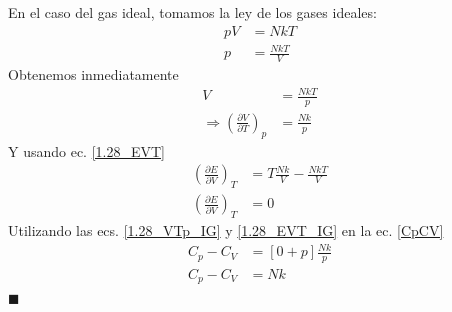 \documentclass[]{article}
\numberwithin{equation}{section}
\newcommand{\0}{\textcolor{gray}{0}}
\newcommand{\deriv}[3]{\left(\frac{\partial #1}{\partial #2} \right)_{#3}}
\newcommand{\qed}{\hfill\(\blacksquare\)}
\begin{document}
\vspace{4mm}
En el caso del gas ideal, tomamos la ley de los gases ideales:\vspace{2mm}
\begin{align}
	p V &= N k T \label{IdealGas}\\
	p &= \frac{N k T}{V}\nonumber
\end{align}
Obtenemos inmediatamente
\begin{align}
	V &= \frac{N k T}{p}\nonumber\\
	\Rightarrow \deriv{V}{T}{p} &= \frac{N k}{p}\label{1.28_VTp_IG}
\end{align}
Y usando ec. \ref{1.28_EVT}
\begin{align}
	\deriv{E}{V}{T} &= T \frac{N k}{V} - \frac{N k T}{V}\nonumber\\
	\deriv{E}{V}{T} &= 0\label{1.28_EVT_IG}
\end{align}
Utilizando las ecs. \ref{1.28_VTp_IG} y \ref{1.28_EVT_IG} en la ec. \ref{CpCV}
\begin{align}
	C_p - C_V &= \left[ 0 + p\right] \frac{N k}{p}\nonumber\\
	C_p - C_V &= N k
\end{align}
\qed
\end{document}
